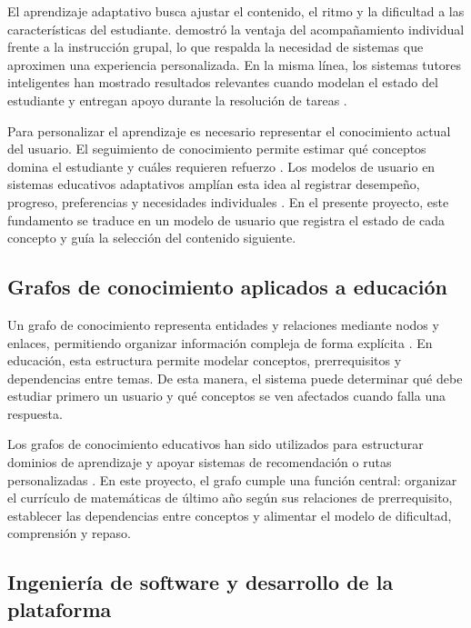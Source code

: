 \documentclass{univalle-perfil}
\begin{document}
El aprendizaje adaptativo busca ajustar el contenido, el ritmo y la dificultad a las características del estudiante. \textcite{bloom1984} demostró la ventaja del acompañamiento individual frente a la instrucción grupal, lo que respalda la necesidad de sistemas que aproximen una experiencia personalizada. En la misma línea, los sistemas tutores inteligentes han mostrado resultados relevantes cuando modelan el estado del estudiante y entregan apoyo durante la resolución de tareas \parencite{vanlehn2011}.

Para personalizar el aprendizaje es necesario representar el conocimiento actual del usuario. El seguimiento de conocimiento permite estimar qué conceptos domina el estudiante y cuáles requieren refuerzo \parencite{corbett1994}. Los modelos de usuario en sistemas educativos adaptativos amplían esta idea al registrar desempeño, progreso, preferencias y necesidades individuales \parencite{brusilovsky2007}. En el presente proyecto, este fundamento se traduce en un modelo de usuario que registra el estado de cada concepto y guía la selección del contenido siguiente.

\subsection{Grafos de conocimiento aplicados a educación}

Un grafo de conocimiento representa entidades y relaciones mediante nodos y enlaces, permitiendo organizar información compleja de forma explícita \parencite{hogan2021}. En educación, esta estructura permite modelar conceptos, prerrequisitos y dependencias entre temas. De esta manera, el sistema puede determinar qué debe estudiar primero un usuario y qué conceptos se ven afectados cuando falla una respuesta.

Los grafos de conocimiento educativos han sido utilizados para estructurar dominios de aprendizaje y apoyar sistemas de recomendación o rutas personalizadas \parencite{chen2018}. En este proyecto, el grafo cumple una función central: organizar el currículo de matemáticas de último año según sus relaciones de prerrequisito, establecer las dependencias entre conceptos y alimentar el modelo de dificultad, comprensión y repaso.

\subsection{Ingeniería de software y desarrollo de la plataforma}
\end{document}
